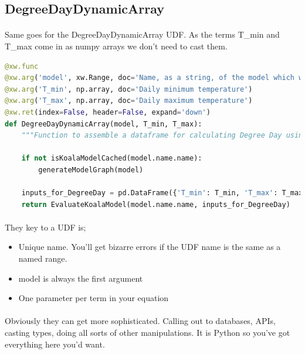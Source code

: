 \documentclass[12pt,a4paper,twoside,openright,titlepage]{article}
\begin{document}
\subsection{DegreeDayDynamicArray}

\paragraph{} Same goes for the DegreeDayDynamicArray UDF. As the terms T\_min and T\_max come in as numpy arrays we don't need to cast them.

\begin{lstlisting}[language=Python]
@xw.func
@xw.arg('model', xw.Range, doc='Name, as a string, of the model which will be evaluated. The Excel cell name / named range.')
@xw.arg('T_min', np.array, doc='Daily minimum temperature')
@xw.arg('T_max', np.array, doc='Daily maximum temperature')
@xw.ret(index=False, header=False, expand='down')
def DegreeDayDynamicArray(model, T_min, T_max):
    """Function to assemble a dataframe for calculating Degree Day using dynamic arrays"""

    if not isKoalaModelCached(model.name.name):
        generateModelGraph(model)

    inputs_for_DegreeDay = pd.DataFrame({'T_min': T_min, 'T_max': T_max})
    return EvaluateKoalaModel(model.name.name, inputs_for_DegreeDay)
\end{lstlisting}

\paragraph{} They key to a UDF is;
\begin{itemize}
	\item Unique name. You'll get bizarre errors if the UDF name is the same as a named range.
	\item model is always the first argument
	\item One parameter per term in your equation
\end{itemize}

\paragraph{} Obviously they can get more sophisticated. Calling out to databases, APIs, casting types, doing all sorts of other manipulations. It is Python so you've got everything here you'd want.

\newpage
\printindex
\end{document}
